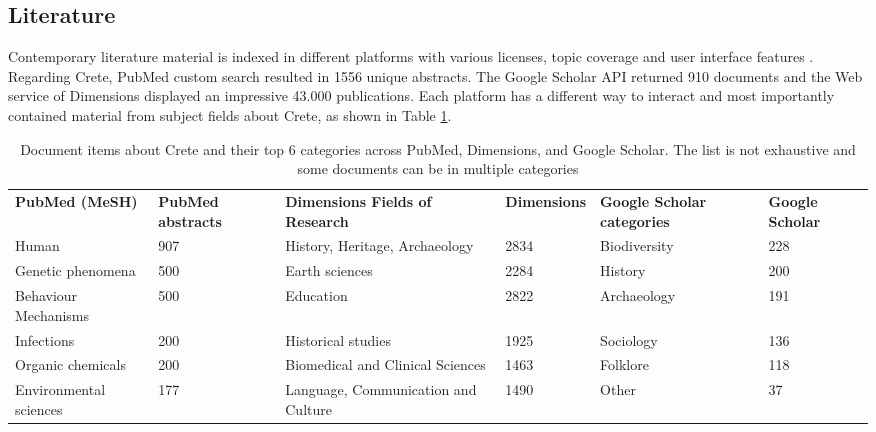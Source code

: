 \documentclass[a4paper,12pt]{article}
\begin{document}

\subsection{Literature}

Contemporary literature material is indexed in different platforms \parencite{harzing2019two-new-kids, walters2025comparing}
with various licenses, topic coverage and user interface features \parencite{borrego2025openalexfeaturesadvantageslimitations}.
Regarding Crete, PubMed custom search resulted in 1556 unique abstracts. 
The Google Scholar API returned 910 documents and the Web service of Dimensions 
displayed an impressive 43.000 publications. 
Each platform has a different way to interact and most importantly contained 
material from subject fields about Crete, as shown in Table \ref{table:crete_literature}.

\begin{table}[htbp]
\centering
\caption{Document items about Crete and their top 6 categories across PubMed, Dimensions, and Google Scholar. The list is not exhaustive and some documents can be in multiple categories}
\label{table:crete_literature}
\begin{tabular}{p{2.5cm}p{2.5cm}p{2.5cm}p{2.5cm}p{2.5cm}p{2.5cm}}
\textbf{PubMed (MeSH)} & \textbf{PubMed abstracts} &
\textbf{Dimensions Fields of Research} & \textbf{Dimensions} &
\textbf{Google Scholar categories} & \textbf{Google Scholar} \\
Human & 907 & History, Heritage, Archaeology & 2834 & Biodiversity & 228 \\
Genetic phenomena & 500 & Earth sciences & 2284 & History & 200 \\
Behaviour Mechanisms & 500 & Education & 2822 & Archaeology & 191 \\
Infections & 200 & Historical studies & 1925 & Sociology & 136 \\
Organic chemicals & 200 & Biomedical and Clinical Sciences & 1463 & Folklore & 118 \\
Environmental sciences & 177 & Language, Communication and Culture & 1490 & Other & 37 \\
\end{tabular}
\end{table}
\end{document}
